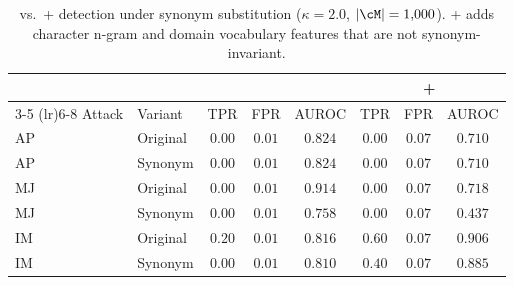 \begin{table}[t]
  \centering
  \small
  \caption{\memsad{} vs.\ \memsad{}+ detection under synonym substitution ($\kappa=2.0$, $|\cM|=1{,}000$). \memsad{}+ adds character n-gram and domain vocabulary features that are not synonym-invariant.}
  \label{tab:memsad_plus}
  \vspace{2pt}
  \begin{tabular}{l l ccc ccc}
    \toprule
    & & \multicolumn{3}{c}{\memsad{}} & \multicolumn{3}{c}{\memsad{}+} \\
    \cmidrule(lr){3-5} \cmidrule(lr){6-8}
    Attack & Variant & TPR & FPR & AUROC & TPR & FPR & AUROC \\
    \midrule
    AP & Original & $0.00$ & $0.01$ & $0.824$ & $0.00$ & $0.07$ & $0.710$ \\
    AP & Synonym & $0.00$ & $0.01$ & $0.824$ & $0.00$ & $0.07$ & $0.710$ \\
    \addlinespace
    MJ & Original & $0.00$ & $0.01$ & $0.914$ & $0.00$ & $0.07$ & $0.718$ \\
    MJ & Synonym & $0.00$ & $0.01$ & $0.758$ & $0.00$ & $0.07$ & $0.437$ \\
    \addlinespace
    IM & Original & $0.20$ & $0.01$ & $0.816$ & $0.60$ & $0.07$ & $0.906$ \\
    IM & Synonym & $0.00$ & $0.01$ & $0.810$ & $0.40$ & $0.07$ & $0.885$ \\
    \bottomrule
  \end{tabular}
  \vspace{-6pt}
\end{table}
